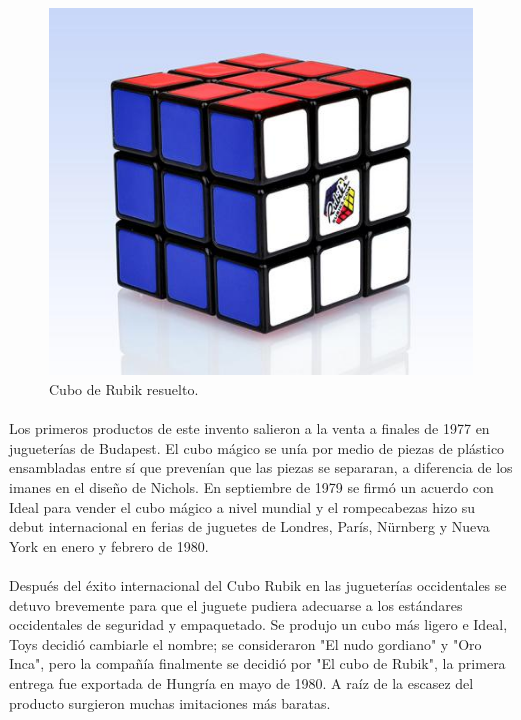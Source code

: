\documentclass[12pt, letterpaper]{article}
\begin{document}
\begin{figure}[hb]
	\centering
	\includegraphics[scale=0.4]{images/rubiks.jpg}
	\caption{Cubo de Rubik resuelto.}
	\label{fig:rubiks}
\end{figure}
\paragraph{}
Los primeros productos de este invento salieron a la venta a finales de 1977 en jugueterías de Budapest. El cubo mágico se unía por medio de piezas de plástico ensambladas entre sí que prevenían que las piezas se separaran, a diferencia de los imanes en el diseño de Nichols. En septiembre de 1979 se firmó un acuerdo con Ideal para vender el cubo mágico a nivel mundial y el rompecabezas hizo su debut internacional en ferias de juguetes de Londres, París, Nürnberg y Nueva York en enero y febrero de 1980.
\paragraph{}
Después del éxito internacional del Cubo Rubik en las jugueterías occidentales se detuvo brevemente para que el juguete pudiera adecuarse a los estándares occidentales de seguridad y empaquetado. Se produjo un cubo más ligero e Ideal, Toys decidió cambiarle el nombre; se consideraron "El nudo gordiano" y "Oro Inca", pero la compañía finalmente se decidió por "El cubo de Rubik", la primera entrega fue exportada de Hungría en mayo de 1980. A raíz de la escasez del producto surgieron muchas imitaciones más baratas.
\end{document}
